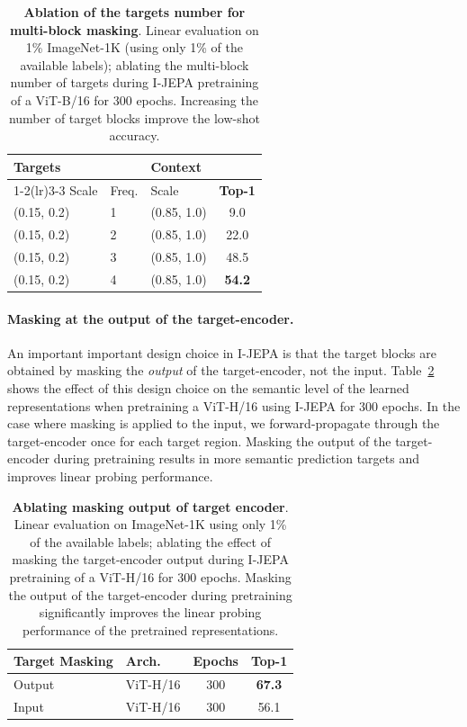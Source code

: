 \documentclass[10pt,twocolumn,letterpaper]{article}
\newcommand{\cc}{\cellcolor{fbApp}}
\newcommand{\putalg}{{I-JEPA}\xspace}
\begin{document}
\begin{table}[!t]
    \centering
    \begin{tabular}{l l l c}
    \multicolumn{2}{l}{\bf\small Targets} & \bf\small Context \\
    \cmidrule(lr){1-2}\cmidrule(lr){3-3}
    \small Scale & \small Freq. & \small Scale & \bf\small Top-1 \\
    \toprule
    \small (0.15, 0.2) &  1 & \small (0.85, 1.0) & 9.0 \\
    \small (0.15, 0.2) &  2 & \small (0.85, 1.0) & 22.0 \\
    \small (0.15, 0.2) &  3 & \small (0.85, 1.0) & 48.5 \\
    \small (0.15, 0.2) &  4 & \small (0.85, 1.0) & \bf 54.2 \\
    \end{tabular}
    \caption{\textbf{Ablation of the targets number for multi-block masking}.
    Linear evaluation on 1\% ImageNet-1K (using only 1\% of the available labels); ablating the multi-block number of targets during \putalg pretraining of a ViT-B/16 for 300 epochs. Increasing the number of target blocks improve the low-shot accuracy.}
    \label{tb:ablation-multiblock-nbtargets}
\end{table}




\paragraph{Masking at the output of the target-encoder.} An important important design choice in \putalg is that the target blocks are obtained by masking the \emph{output} of the target-encoder, not the input.
Table~\ref{tb:ablation-masking-output} shows the effect of this design choice on the semantic level of the learned representations when pretraining a ViT-H/16 using \putalg for 300 epochs.
 In the case where masking is applied to the input, we forward-propagate through the target-encoder once for each target region.
 Masking the output of the target-encoder during pretraining results in more semantic prediction targets and improves linear probing performance.
 \begin{table}[h]
     \centering
     \begin{tabular}{l l c c}
         \bf\small Target Masking & \bf\small Arch. & \bf\small Epochs & \bf\small Top-1 \\
         \toprule
         \cc\small Output & \cc\small ViT-H/16 & \cc300 & \cc\bf 67.3 \\
         \small Input & \small ViT-H/16 & 300 & 56.1
     \end{tabular}
     \caption{\textbf{Ablating masking output of target encoder}.
     Linear evaluation on ImageNet-1K using only 1\% of the available labels; ablating the effect of masking the target-encoder output during \putalg pretraining of a ViT-H/16 for 300 epochs.
     Masking the output of the target-encoder during pretraining significantly improves the linear probing performance of the pretrained representations.}
     \label{tb:ablation-masking-output}
\end{table}
 
\end{document}
